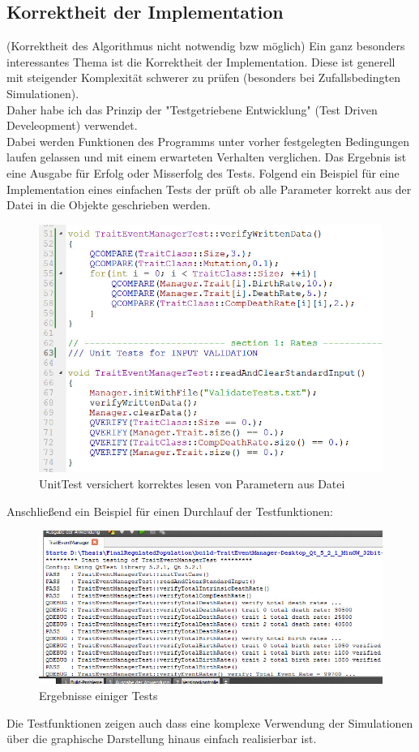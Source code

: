 \documentclass{article}
\begin{document}
	\subsection{Korrektheit der Implementation}
	(Korrektheit des Algorithmus nicht notwendig bzw möglich)
	Ein ganz besonders interessantes Thema ist die Korrektheit der Implementation. Diese ist generell mit steigender Komplexität schwerer zu prüfen (besonders bei Zufallsbedingten Simulationen).\\
	Daher habe ich das Prinzip der "{}Testgetriebene Entwicklung"{}  (Test Driven Develeopment) verwendet.\\
	Dabei werden Funktionen des Programms unter vorher festgelegten Bedingungen laufen gelassen und mit einem erwarteten Verhalten verglichen. Das Ergebnis ist eine Ausgabe für Erfolg oder Misserfolg des Tests. Folgend ein Beispiel für eine Implementation eines einfachen Tests der prüft ob alle Parameter korrekt aus der Datei in die Objekte geschrieben werden.
	\begin{figure}[H]
		\centering
		\includegraphics[width=0.7\linewidth]{./UnitTest}
		\caption[UnitTest]{UnitTest versichert korrektes lesen von Parametern aus Datei}
		\label{Unit Test}
	\end{figure}
	Anschließend ein Beispiel für einen Durchlauf der Testfunktionen:
	\begin{figure}[H]
		\centering
		\includegraphics[width=0.7\linewidth]{./TestResult_start}
		\caption[Test Resultat einer Test Datei]{Ergebnisse einiger Tests}
		\label{Test Results}
	\end{figure}
	Die Testfunktionen zeigen auch dass eine komplexe Verwendung der Simulationen über die graphische Darstellung hinaus einfach realisierbar ist.
	
\end{document}
